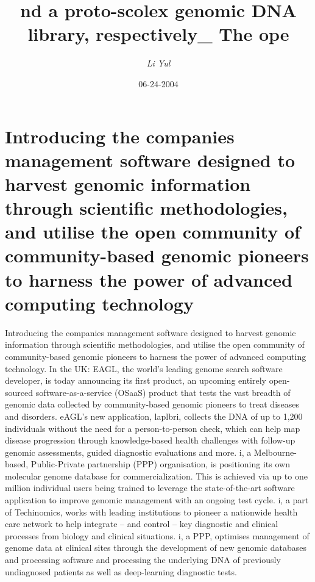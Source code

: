 \documentclass{article}%
\title{nd a proto{-}scolex genomic DNA library, respectively\_ The ope}%
\author{\textit{Li Yul}}%
\date{06-24-2004}%
\begin{document}
%
\normalsize%
\maketitle%
\section{Introducing the companies management software designed to harvest genomic information through scientific methodologies, and utilise the open community of community{-}based genomic pioneers to harness the power of advanced computing technology}%
\label{sec:Introducingthecompaniesmanagementsoftwaredesignedtoharvestgenomicinformationthroughscientificmethodologies,andutilisetheopencommunityofcommunity{-}basedgenomicpioneerstoharnessthepowerofadvancedcomputingtechnology}%
Introducing the companies management software designed to harvest genomic information through scientific methodologies, and utilise the open community of community{-}based genomic pioneers to harness the power of advanced computing technology.\newline%
In the UK:\newline%
EAGL, the world’s leading genome search software developer, is today announcing its first product, an upcoming entirely open{-}sourced software{-}as{-}a{-}service (OSaaS) product that tests the vast breadth of genomic data collected by community{-}based genomic pioneers to treat diseases and disorders.\newline%
eAGL’s new application, laplbri, collects the DNA of up to 1,200 individuals without the need for a person{-}to{-}person check, which can help map disease progression through knowledge{-}based health challenges with follow{-}up genomic assessments, guided diagnostic evaluations and more.\newline%
i, a Melbourne{-}based, Public{-}Private partnership (PPP) organisation, is positioning its own molecular genome database for commercialization. This is achieved via up to one million individual users being trained to leverage the state{-}of{-}the{-}art software application to improve genomic management with an ongoing test cycle.\newline%
i, a part of Techinomics, works with leading institutions to pioneer a nationwide health care network to help integrate – and control – key diagnostic and clinical processes from biology and clinical situations.\newline%
i, a PPP, optimises management of genome data at clinical sites through the development of new genomic databases and processing software and processing the underlying DNA of previously undiagnosed patients as well as deep{-}learning diagnostic tests.\newline%
\end{document}
